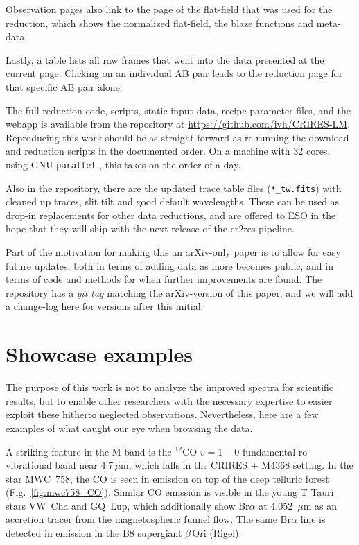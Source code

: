 \documentclass{aa}
\newcommand{\um}{$\mu$m}
\begin{document}
Observation pages also link to the page of the flat-field that was used for the
reduction, which shows the normalized flat-field, the blaze functions and meta-data.

Lastly, a table lists all raw frames that went into the data presented at the current page.
Clicking on an individual AB pair leads to the reduction page for that specific AB pair alone.

The full reduction code, scripts, static input data, recipe parameter files, and the webapp is available from 
the repository at 
\url{https://github.com/ivh/CRIRES-LM}. Reproducing this work should be as
straight-forward as re-running the download and reduction scripts in the documented
order. On a machine with 32 cores, using GNU \texttt{parallel} \citep{tange_parallel}, this takes
on the order of a day.

Also in the repository, there are the updated trace table files
(\texttt{*\_tw.fits}) with cleaned up traces, slit tilt and good default
wavelengths. These can be used as drop-in
replacements for other data reductions, and are offered to ESO in the
hope that they will ship with the next release of the cr2res pipeline. 

Part of the motivation for making this an arXiv-only paper is to allow for
easy future updates, both in terms of adding data as more becomes
public, and in terms of code and methods for when further improvements
are found. The repository has a \emph{git tag} matching the arXiv-version of
this paper, and we will add a change-log here for versions after this initial.

\section{Showcase examples}
\label{sec:examples}

The purpose of this work is not to analyze the improved spectra for scientific results,
but to enable other researchers with the necessary expertise to easier exploit
these hitherto neglected observations. Nevertheless, here are a few examples of
what caught our eye when browsing the data.

A striking feature in the M band is the $^{12}$CO $v=1\!-\!0$
fundamental ro-vibrational band near 4.7\,\um{}, which falls in the CRIRES + M4368
setting. In the star MWC~758, the CO is seen in emission on top of the deep 
telluric forest (Fig.~\ref{fig:mwc758_CO}). Similar CO emission is visible in 
the young T Tauri stars VW~Cha and GQ~Lup, which additionally show 
Br$\alpha$ at 4.052~\um{} as an accretion tracer from the magnetospheric 
funnel flow. The same Br$\alpha$ line is detected in emission in the 
B8 supergiant $\beta$\,Ori (Rigel).
\end{document}
